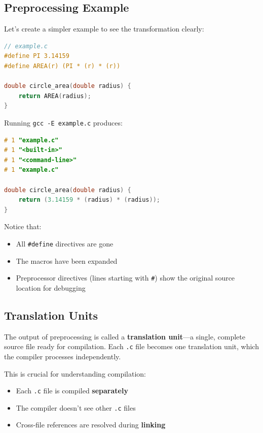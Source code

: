 \subsection{Preprocessing Example}

Let's create a simpler example to see the transformation clearly:

\begin{lstlisting}[language=C]
// example.c
#define PI 3.14159
#define AREA(r) (PI * (r) * (r))

double circle_area(double radius) {
    return AREA(radius);
}
\end{lstlisting}

Running \texttt{gcc -E example.c} produces:

\begin{lstlisting}[language=C]
# 1 "example.c"
# 1 "<built-in>"
# 1 "<command-line>"
# 1 "example.c"

double circle_area(double radius) {
    return (3.14159 * (radius) * (radius));
}
\end{lstlisting}

Notice that:
\begin{itemize}
    \item All \texttt{\#define} directives are gone
    \item The macros have been expanded
    \item Preprocessor directives (lines starting with \texttt{\#}) show the original source location for debugging
\end{itemize}

\subsection{Translation Units}

The output of preprocessing is called a \textbf{translation unit}—a single, complete source file ready for compilation. Each \texttt{.c} file becomes one translation unit, which the compiler processes independently.

This is crucial for understanding compilation:
\begin{itemize}
    \item Each \texttt{.c} file is compiled \textbf{separately}
    \item The compiler doesn't see other \texttt{.c} files
    \item Cross-file references are resolved during \textbf{linking}
\end{itemize}


